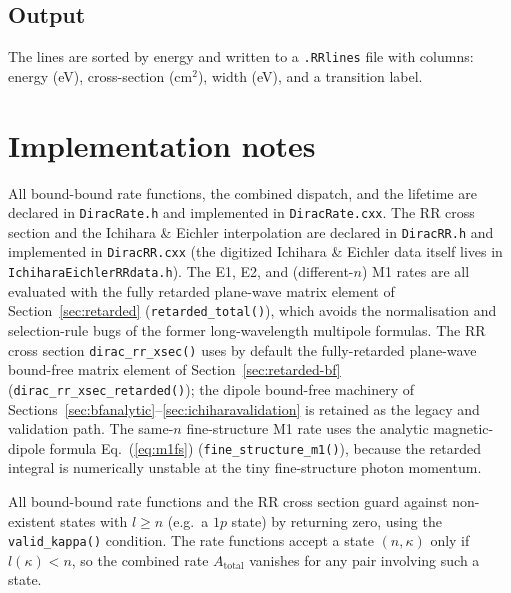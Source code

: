 \documentclass[11pt,a4paper]{article}
\begin{document}
\subsection{Output}

The lines are sorted by energy and written to a {\tt .RRlines} file with
columns: energy (eV), cross-section (cm$^{2}$), width (eV), and a transition
label.

\section{Implementation notes}

All bound-bound rate functions, the combined dispatch, and the lifetime
are declared in {\tt DiracRate.h} and implemented in {\tt DiracRate.cxx}.
The RR cross section and the Ichihara \& Eichler interpolation are
declared in {\tt DiracRR.h} and implemented in {\tt DiracRR.cxx}
(the digitized Ichihara \& Eichler data itself lives in
{\tt IchiharaEichlerRRdata.h}). The E1, E2, and (different-$n$) M1 rates are all
evaluated with the fully retarded plane-wave matrix element of
Section~\ref{sec:retarded} ({\tt retarded\_total()}), which avoids the
normalisation and selection-rule bugs of the former long-wavelength
multipole formulas.  The RR cross section {\tt dirac\_rr\_xsec()} uses by
default the fully-retarded plane-wave bound-free matrix element of
Section~\ref{sec:retarded-bf} ({\tt dirac\_rr\_xsec\_retarded()}); the
dipole bound-free machinery of
Sections~\ref{sec:bfanalytic}--\ref{sec:ichiharavalidation} is retained
as the legacy and validation path.  The same-$n$ fine-structure M1 rate uses the
analytic magnetic-dipole formula Eq.~(\ref{eq:m1fs})
({\tt fine\_structure\_m1()}), because the retarded integral is
numerically unstable at the tiny fine-structure photon momentum.

All bound-bound rate functions and the RR cross section guard against
non-existent states with $l \ge n$ (e.g.\ a $1p$ state) by returning
zero, using the {\tt valid\_kappa()} condition.  The rate functions
accept a state $(n,\kappa)$ only if $l(\kappa) < n$, so the combined
rate $A_{\text{total}}$ vanishes for any pair involving such a state.
\end{document}
